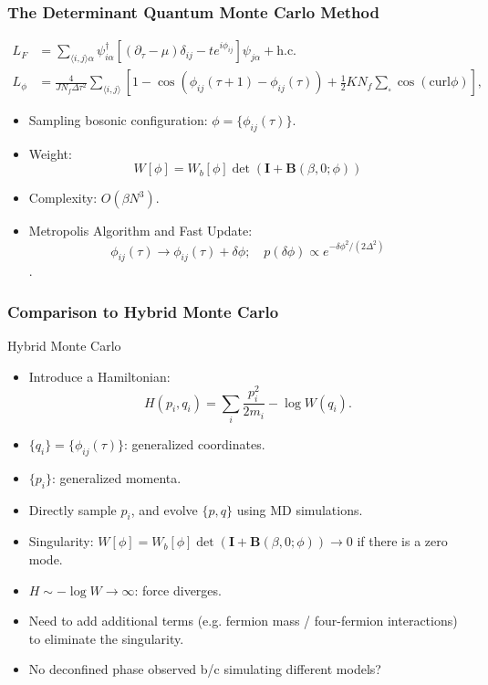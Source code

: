 \documentclass[xcolor=table, 10pt, aspectratio=43]{beamer}
\begin{document}
\begin{frame}
  \frametitle{The Determinant Quantum Monte Carlo Method}
  \begin{align*}
  L_F &= \sum_{\langle i,j \rangle\alpha}{\psi}^{\dagger}_{i\alpha} \left[(\partial_\tau -\mu)\delta_{ij}-t e^{i\phi_{ij}}   \right]   {\psi}_{j\alpha} + \text{h.c.}\\
  L_\phi &= \frac{4} {JN_{f}\Delta \tau ^2} \sum_{\langle i,j \rangle}
  \left[ 1-\cos(\phi_{ij}(\tau+1)-\phi_{ij}(\tau))
   +\frac{1}{2}K N_f\sum_{\square}\cos (\text{curl} \phi) \right],
\end{align*}
\begin{itemize}
  \item Sampling bosonic configuration: $\phi = \{\phi_{ij}(\tau)\}$.
  \item Weight:
  \[W[\phi] = W_b[\phi]\det(\mathbf I + \mathbf B(\beta,0;\phi))\]
  \item Complexity: $O(\beta N^3)$.
  \item Metropolis Algorithm and Fast Update:
  \[\phi_{ij}(\tau)\rightarrow\phi_{ij}(\tau)+\delta\phi;\quad p(\delta\phi)\propto e^{-\delta\phi^2/(2\Delta^2)}\].
\end{itemize}
\end{frame}


\begin{frame}
  \frametitle{Comparison to Hybrid Monte Carlo}
  \begin{block}{Hybrid Monte Carlo}
    \begin{itemize}
    \item Introduce a Hamiltonian:
    \[H(p_i, q_i) = \sum_i\frac{p_i^2}{2m_i} - \log W(q_i).\]
    \item $\{q_i\}=\{\phi_{ij}(\tau)\}$: generalized coordinates.
    \item $\{p_i\}$: generalized momenta.
    \item Directly sample $p_i$, and evolve $\{p,q\}$ using MD simulations.
  \end{itemize}
  \end{block}
  \begin{itemize}
    \item Singularity: $W[\phi] = W_b[\phi]\det(\mathbf I + \mathbf B(\beta,0;\phi))\rightarrow0$ if there is a zero mode.
    \item $H\sim -\log W\rightarrow \infty$: force diverges.
    \item Need to add additional terms (e.g. fermion mass / four-fermion interactions) to eliminate the singularity.
    \item No deconfined phase observed b/c simulating different models?
  \end{itemize}
\end{frame}
\end{document}
